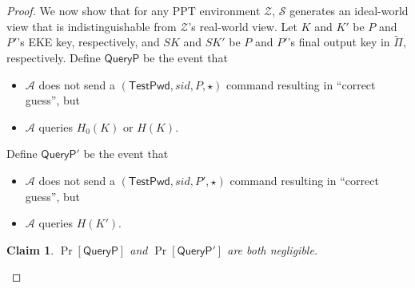 \documentclass{article}
\newtheorem{claim}{Claim}
\newcommand{\adv}{\mathcal{A}}
\newcommand{\env}{\mathcal{Z}}
\renewcommand{\sim}{\mathcal{S}}
\newcommand{\TestPwd}{\mathsf{TestPwd}}
\begin{document}
\begin{proof}
We now show that for any PPT environment $\env$, $\sim$ generates an ideal-world view that is indistinguishable from $\env$'s real-world view. Let $K$ and $K'$ be $P$ and $P'$'s EKE key, respectively, and $SK$ and $SK'$ be $P$ and $P'$'s final output key in $\tilde{\Pi}$, respectively. Define $\mathsf{QueryP}$ be the event that
\begin{itemize}
  \item $\adv$ does not send a $(\TestPwd, sid, P, \star)$ command resulting in ``correct guess'', but
  \item $\adv$ queries $H_0(K)$ or $H(K)$.
\end{itemize}
Define $\mathsf{QueryP'}$ be the event that
\begin{itemize}
  \item $\adv$ does not send a $(\TestPwd, sid, P', \star)$ command resulting in ``correct guess'', but
  \item $\adv$ queries $H(K')$.
\end{itemize}
\begin{claim}
$\Pr[\mathsf{QueryP}]$ and $\Pr[\mathsf{QueryP'}]$ are both negligible.
\end{claim}


\end{proof}
\end{document}
